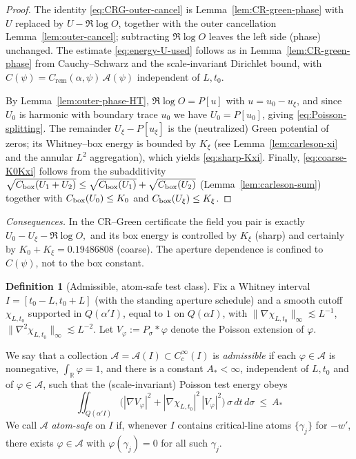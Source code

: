 \documentclass[11pt]{article}
\providecommand{\CboxZeta}{K_0 + K_\xi}%
\renewcommand{\CboxZeta}{0.19486808}
\theoremstyle{definition}
\newtheorem{definition}[theorem]{Definition}
\theoremstyle{remark}
\theoremstyle{definition}
\newcommand{\R}{\mathbb{R}}
\newcommand{\Poisson}{P}
\begin{document}
\begin{proof}
The identity \eqref{eq:CRG-outer-cancel} is Lemma~\ref{lem:CR-green-phase} with $U$ replaced by $U-\Re\log O$, together with the outer cancellation Lemma~\ref{lem:outer-cancel}; subtracting $\Re\log O$ leaves the left side (phase) unchanged. The estimate \eqref{eq:energy-U-used} follows as in Lemma~\ref{lem:CR-green-phase} from Cauchy--Schwarz and the scale‑invariant Dirichlet bound, with $C(\psi)=C_{\mathrm{rem}}(\alpha,\psi)\,\mathcal A(\psi)$ independent of $L,t_0$.

By Lemma~\ref{lem:outer-phase-HT}, $\Re\log O=\Poisson[u]$ with $u=u_0-u_\xi$, and since $U_0$ is harmonic with boundary trace $u_0$ we have $U_0=\Poisson[u_0]$, giving \eqref{eq:Poisson-splitting}. The remainder $U_\xi-\Poisson[u_\xi]$ is the (neutralized) Green potential of zeros; its Whitney–box energy is bounded by $K_\xi$ (see Lemma~\ref{lem:carleson-xi} and the annular $L^2$ aggregation), which yields \eqref{eq:sharp-Kxi}. Finally, \eqref{eq:coarse-K0Kxi} follows from the subadditivity
\(
\sqrt{C_{\rm box}(U_1+U_2)}\le \sqrt{C_{\rm box}(U_1)}+\sqrt{C_{\rm box}(U_2)}
\)
(Lemma~\ref{lem:carleson-sum}) together with $C_{\rm box}(U_0)\le K_0$ and $C_{\rm box}(U_\xi)\le K_\xi$.
\end{proof}

\noindent\emph{Consequences.}
In the CR–Green certificate the field you pair is exactly
\(
U_0-U_\xi-\Re\log O,
\)
and its box energy is controlled by $K_\xi$ (sharp) and certainly by $K_0+K_\xi=\CboxZeta$ (coarse).
The aperture dependence is confined to $C(\psi)$, not to the box constant.


\begin{definition}[Admissible, atom-safe test class]\label{def:admissible-class}
Fix a Whitney interval \(I=[t_0-L,t_0+L]\) (with the standing aperture schedule)
and a smooth cutoff \(\chi_{L,t_0}\) supported in \(Q(\alpha'I)\), equal to \(1\) on \(Q(\alpha I)\), with
\(\|\nabla\chi_{L,t_0}\|_\infty\lesssim L^{-1}\), \(\|\nabla^2\chi_{L,t_0}\|_\infty\lesssim L^{-2}\).
Let \(V_\varphi:=P_\sigma*\varphi\) denote the Poisson extension of \(\varphi\).


We say that a collection \(\mathcal A=\mathcal A(I)\subset C_c^\infty(I)\) is \emph{admissible}
if each \(\varphi\in\mathcal A\) is nonnegative, \(\int_{\R}\varphi=1\), and there is a constant \(A_\ast<\infty\),
independent of \(L,t_0\) and of \(\varphi\in\mathcal A\), such that the (scale-invariant) Poisson test energy obeys
\begin{equation}\label{eq:Poisson-energy-bound}
  \iint_{Q(\alpha'I)} \Big(|\nabla V_\varphi|^2 + |\nabla\chi_{L,t_0}|^2\,|V_\varphi|^2\Big)\,\sigma\,dt\,d\sigma
  \ \le\ A_\ast
\end{equation}
We call \(\mathcal A\) \emph{atom-safe} on \(I\) if, whenever \(I\) contains critical-line atoms \(\{\gamma_j\}\) for \(-w'\),
there exists \(\varphi\in\mathcal A\) with \(\varphi(\gamma_j)=0\) for all such \(\gamma_j\).
\end{definition}
\end{document}

